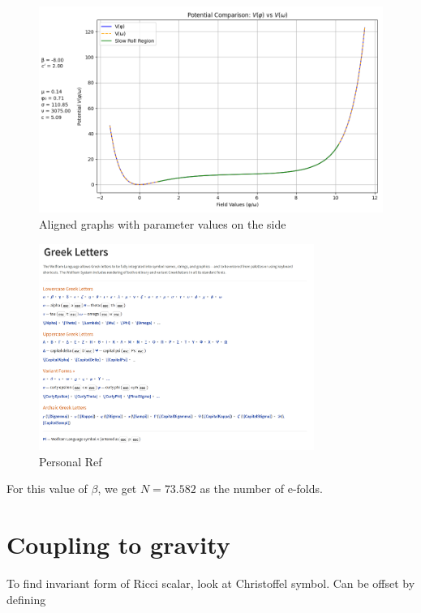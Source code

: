 \documentclass{article}
\begin{document}
\begin{figure}[h!]
    \centering
    \includegraphics[width=1\textwidth]{Comparing Silvio - Barker.png}
    \caption{Aligned graphs with parameter values on the side}
    \label{Aligned Potential}
\end{figure}

\begin{figure}[h!]
    \centering
    \includegraphics[width=0.8\textwidth]{Insert greek in mathematica.png}
    \caption{Personal Ref}
    \label{Greek in Mathematica}
\end{figure}

For this value of $\beta$, we get $N = 73.582$ as the number of e-folds.

\newpage

\newpage
\section{Coupling to gravity}


To find invariant form of Ricci scalar, look at Christoffel symbol. Can be offset by defining
\end{document}

